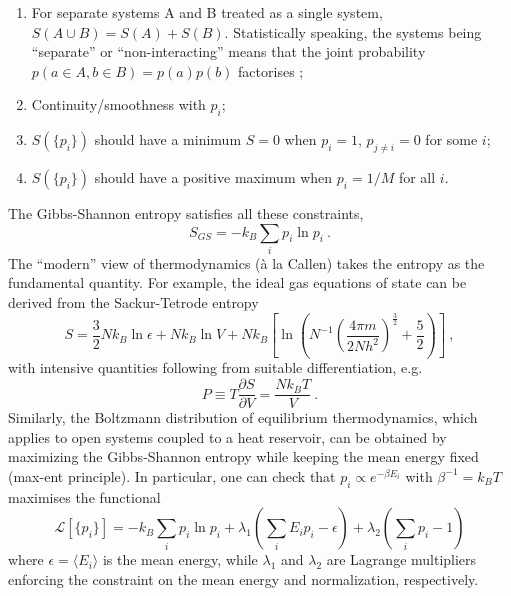\begin{enumerate}
    \item For separate systems A and B treated as a single system, $S(A \cup B) = S(A) + S(B)$. Statistically speaking, the systems being ``separate'' or ``non-interacting'' means that the joint probability $p(a \in A, b \in B) = p(a)p(b)$ factorises ;
    \item Continuity/smoothness with $p_i$;
    \item $S(\{p_i\})$ should have a minimum $S=0$ when $p_i = 1$, $p_{j\neq i} = 0$ for some $i$;
    \item $S(\{p_i\})$ should have a positive maximum when $p_i = 1/M$ for all $i$.
\end{enumerate}
The Gibbs-Shannon entropy satisfies all these constraints,
%
\begin{equation}
    S_{GS} = -k_B \sum_i p_i \ln p_i~.
\end{equation}
%
The ``modern'' view of thermodynamics ({\`a} la Callen) takes the entropy as the fundamental quantity. For example, the ideal gas equations of state can be derived from the Sackur-Tetrode entropy
%
\begin{equation}
    S = \frac{3}{2}N k_B \ln \epsilon + N k_B \ln V + N k_B \left[ \ln\left( N^{-1} \left( \frac{4\pi m}{2Nh^2}\right)^{\frac{3}{2}} + \frac{5}{2} \right) \right]~,
\end{equation}
%
with intensive quantities following from suitable differentiation, e.g.
%
\begin{equation}
    P \equiv T \frac{\partial S}{\partial V} = \frac{Nk_B T}{V}~.
\end{equation}
%
Similarly, the Boltzmann distribution of equilibrium thermodynamics, which applies to open systems coupled to a heat reservoir, can be obtained by maximizing the Gibbs-Shannon entropy while keeping the mean energy fixed (max-ent principle). In particular, one can check that $p_i \propto e^{-\beta E_i}$ with $\beta^{-1} = k_B T$ maximises the functional
%
\begin{equation}
    \mathcal{L}[\{p_i\}] = -k_B \sum_{i} p_i \ln p_i + \lambda_1 \left(\sum_i E_i p_i - \epsilon \right) + \lambda_2 \left(\sum_i p_i - 1 \right) 
\end{equation}
%
where $\epsilon = \langle E_i \rangle$ is the mean energy, while $\lambda_1$ and $\lambda_2$ are Lagrange multipliers enforcing the constraint on the mean energy and normalization, respectively.




